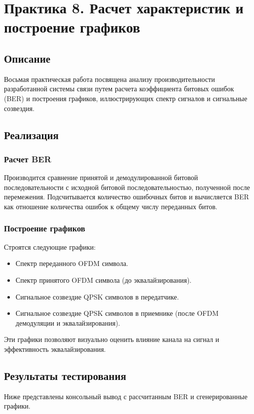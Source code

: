 \section{Практика 8. Расчет характеристик и построение графиков}

\subsection{Описание}
Восьмая практическая работа посвящена анализу производительности разработанной системы связи путем расчета коэффициента битовых ошибок (BER) и построения графиков, иллюстрирующих спектр сигналов и сигнальные созвездия.

\subsection{Реализация}
\subsubsection{Расчет BER}
Производится сравнение принятой и демодулированной битовой последовательности с исходной битовой последовательностью, полученной после перемежения. Подсчитывается количество ошибочных битов и вычисляется BER как отношение количества ошибок к общему числу переданных битов.

\subsubsection{Построение графиков}
Строятся следующие графики:
\begin{itemize}
    \item Спектр переданного OFDM символа.
    \item Спектр принятого OFDM символа (до эквалайзирования).
    \item Сигнальное созвездие QPSK символов в передатчике.
    \item Сигнальное созвездие QPSK символов в приемнике (после OFDM демодуляции и эквалайзирования).
\end{itemize}
Эти графики позволяют визуально оценить влияние канала на сигнал и эффективность эквалайзирования.

\subsection{Результаты тестирования}
Ниже представлены консольный вывод с рассчитанным BER и сгенерированные графики.

